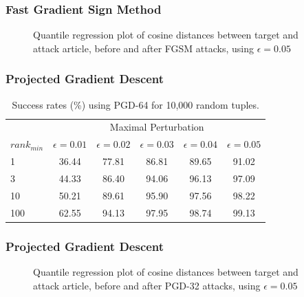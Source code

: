 \documentclass{beamer}
\begin{document}
	\begin{frame}
		\frametitle{Fast Gradient Sign Method}
		\begin{figure}[H]
			\centering
			\resizebox{0.7\textwidth}{!}{}
			\caption{Quantile regression plot of cosine distances between target and attack article, before and after FGSM attacks, using $\epsilon=0.05$}
			\label{fig:fgsm-quantile}
		\end{figure}
	\end{frame}
	
	
	\begin{frame}
		\frametitle{Projected Gradient Descent}
		\begin{table}[H]
			\centering
			\begin{tabular}{ lccccc } 
				\toprule		
				& \multicolumn{5}{c}{Maximal Perturbation} \\
				\cmidrule{2-6}
				$rank_{min}$ & $\epsilon = 0.01$ & $\epsilon = 0.02$ & $\epsilon = 0.03$  & $\epsilon = 0.04$ & $\epsilon = 0.05$  \\
				\midrule
				1 & 36.44 & 77.81 & 86.81 & 89.65 & 91.02 \\
				3 & 44.33 & 86.40 & 94.06 & 96.13 & 97.09 \\
				10 & 50.21 & 89.61 & 95.90 & 97.56 & 98.22 \\
				100 & 62.55 & 94.13 & 97.95 & 98.74 & 99.13 \\
				\bottomrule
			\end{tabular}
			\caption{Success rates (\%) using PGD-64 for 10,000 random tuples.}
			\label{tab:pgd-results}
		\end{table}
	\end{frame}
	
	\begin{frame}
		\frametitle{Projected Gradient Descent}
		\begin{figure}[H]
			\centering
			\resizebox{0.7\textwidth}{!}{}
			\caption{Quantile regression plot of cosine distances between target and attack article, before and after PGD-32 attacks, using $\epsilon=0.05$}
			\label{fig:pgd-quantile}
		\end{figure}
	\end{frame}
	
\end{document}
